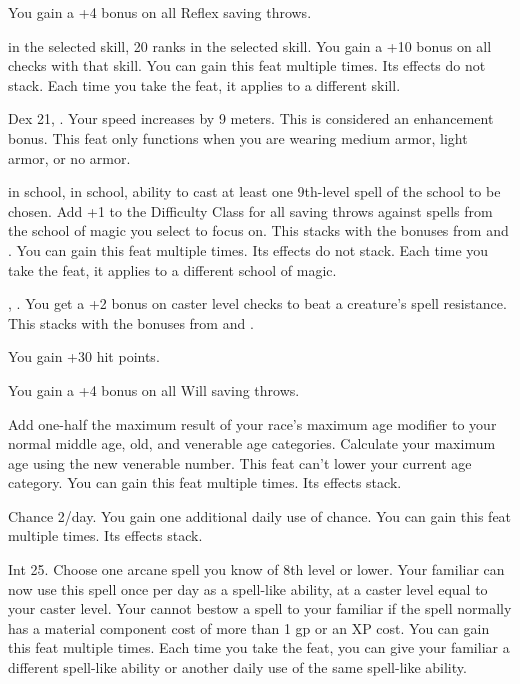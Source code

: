 {}{You gain a +4 bonus on all Reflex saving throws.}

{}
{ in the selected skill, 20 ranks in the selected skill.}
{You gain a +10 bonus on all checks with that skill.}
{}{You can gain this feat multiple times. Its effects do not stack. Each time you take the feat, it applies to a different skill.}

{}
{Dex 21, .}
{Your speed increases by 9 meters. This is considered an enhancement bonus.}
{}{This feat only functions when you are wearing medium armor, light armor, or no armor.}

{}
{ in school,  in school, ability to cast at least one 9th-level spell of the school to be chosen.}
{Add +1 to the Difficulty Class for all saving throws against spells from the school of magic you select to focus on. This stacks with the bonuses from  and .}
{}{You can gain this feat multiple times. Its effects do not stack. Each time you take the feat, it applies to a different school of magic.}

{, .}
{You get a +2 bonus on caster level checks to beat a creature's spell resistance. This stacks with the bonuses from  and .}

{}
{You gain +30 hit points.}

{}{You gain a +4 bonus on all Will saving throws.}

{}{}
{Add one-half the maximum result of your race's maximum age modifier to your normal middle age, old, and venerable age categories. Calculate your maximum age using the new venerable number. This feat can't lower your current age category.}
{}{You can gain this feat multiple times. Its effects stack.}

{}
{Chance 2/day.}
{You gain one additional daily use of chance.}
{}{You can gain this feat multiple times. Its effects stack.}

{}
{Int 25.}
{Choose one arcane spell you know of 8th level or lower. Your familiar can now use this spell once per day as a spell-like ability, at a caster level equal to your caster level. Your cannot bestow a spell to your familiar if the spell normally has a material component cost of more than 1 gp or an XP cost.}
{}{You can gain this feat multiple times. Each time you take the feat, you can give your familiar a different spell-like ability or another daily use of the same spell-like ability.}

